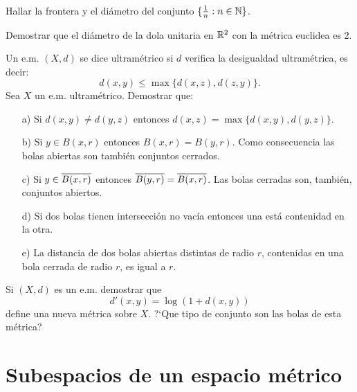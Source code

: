 \begin{ejercicio}{} Hallar la frontera y el diámetro del conjunto
$\{\frac1n:n\in\mathbb{N}\}$.
\end{ejercicio}
\begin{ejercicio}{} Demostrar que el diámetro de la dola unitaria
en $\mathbb{R}^2$ con la métrica euclidea es 2.
\end{ejercicio}
\begin{ejercicio}{} Un e.m. $(X,d)$ se dice ultramétrico si $d$ verifica la
desigualdad ultramétrica, es decir:
\[
	d(x,y)\leq\max\{d(x,z),d(z,y)\}.
\]
Sea $X$ un e.m. ultramétrico. Demostrar que:
\begin{itemize}
\item[a)] Si $d(x,y)\neq d(y,z)$ entonces
$d(x,z)=\max\{d(x,y),d(y,z)\}$.
\item[b)] Si $y\in B(x,r)$ entonces $B(x,r)=B(y,r)$. Como
consecuencia las bolas abiertas son también conjuntos cerrados.
\item[c)] Si $y\in\overline{B(x,r)}$ entonces $\overline{B(y,r)}=\overline{B(x,r)}$.
Las bolas cerradas son, también, conjuntos abiertos.

\item[d)] Si dos bolas tienen intersección no vacía
entonces una está  contenidad en la otra.

\item[e)] La distancia de dos bolas abiertas distintas de radio
$r$, contenidas en una bola cerrada de radio $r$, es igual a $r$.
\end{itemize}
\end{ejercicio}

 \begin{ejercicio}{} Si $(X,d)$ es un e.m. demostrar que
 \[
	d'(x,y)=\log(1+d(x,y))
 \]
 define una nueva métrica sobre $X$. ?`Que tipo de conjunto son
 las bolas de esta métrica?
 \end{ejercicio}


% 
% 


\section{Subespacios de un espacio métrico}

